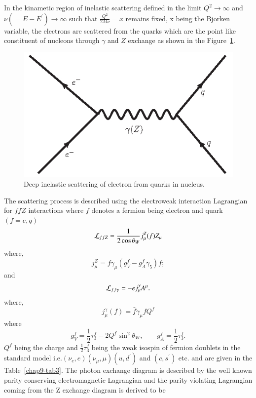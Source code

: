 In the kinametic region of inelastic scattering defined in the limit $Q^2\rightarrow \infty$ and $\nu(=E-E^\prime)\rightarrow \infty$  such that $\frac{Q^2}{2M\nu}=x$ remains fixed, x being the Bjorken  variable,  the  electrons are scattered from the quarks which are the point like  constituent of nucleons  through $\gamma$ and $Z$ exchange as shown in the Figure~\ref{chap9-fig4}. 
\medskip

\begin{figure}[H]
\centering
\includegraphics[scale=0.35]{src/images/chap9/fig3.jpg}
\caption{Deep inelastic scattering of electron from quarks in nucleus.}\label{chap9-fig4}
\end{figure}

The scattering process is described using the electroweak interaction Lagrangian for $ffZ$ interactions where $f$ denotes a fermion being electron  and quark $(f=e,q)$
\begin{equation}
{\cal L}_{ffZ}= \frac{1}{2\cos\theta_W} j^Z_\mu(f) Z_\mu \label{chap9-eq28}
\end{equation}
where,
\begin{equation}
j_\mu^Z = \bar{f}\gamma_\mu(g_V^f-g_A^f\gamma_5)f; \label{chap9-eq29}
\end{equation}
and
\begin{equation}
{\cal L}_{ff\gamma}=-ej^\gamma_\mu A^\mu. \label{chap9-eq30}
\end{equation}
where, 
\begin{equation}
j_\mu^\gamma (f)= \bar{f}\gamma_\mu f Q^f \label{chap9-eq31}
\end{equation}
where
\begin{equation}
g_V^f=\frac{1}{2}\tau_3^f-2Q^f \sin^2\theta_W,~~~~~~~~~
g_A^f=\frac{1}{2}\tau^f_3. \label{chap9-eq32}
\end{equation}
$Q^f$ being the charge and $\frac{1}{2}\tau^f_3$ being the weak isospin of fermion doublets in the standard model  i.e.$(\nu_e, e)(\nu_\mu,\mu)(u, d^\prime)$ and $(c,s^\prime)$ etc. and are given in the Table~\ref{chap9-tab3}. The photon exchange diagram is described by the well known parity conserving electromagnetic Lagrangian and the parity violating Lagrangian coming from the Z exchange diagram is  derived to be 
\bigskip

